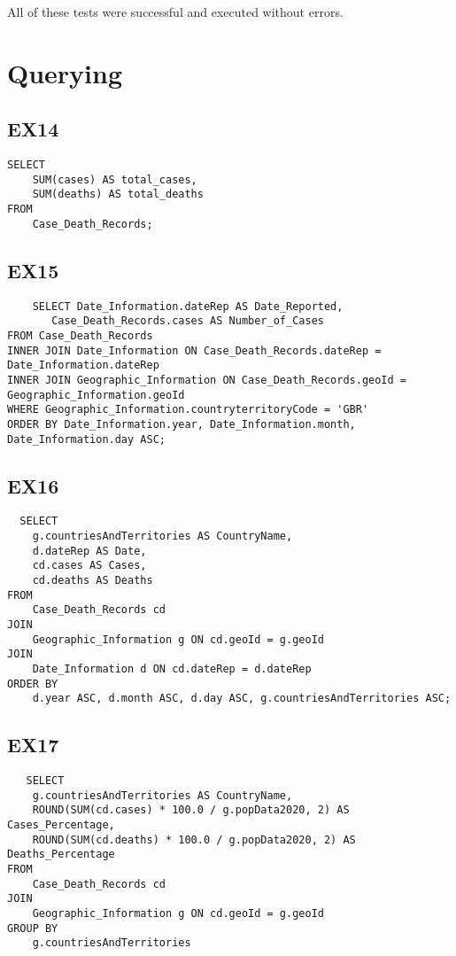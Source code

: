 \documentclass{article}
\begin{document}
All of these tests were successful and executed without errors.
\section{Querying}
\subsection{EX14}


\begin{verbatim}
SELECT 
    SUM(cases) AS total_cases,
    SUM(deaths) AS total_deaths
FROM 
    Case_Death_Records;
\end{verbatim}
\subsection{EX15}
\begin{verbatim}
    SELECT Date_Information.dateRep AS Date_Reported,
       Case_Death_Records.cases AS Number_of_Cases
FROM Case_Death_Records
INNER JOIN Date_Information ON Case_Death_Records.dateRep = Date_Information.dateRep
INNER JOIN Geographic_Information ON Case_Death_Records.geoId = Geographic_Information.geoId
WHERE Geographic_Information.countryterritoryCode = 'GBR'
ORDER BY Date_Information.year, Date_Information.month, Date_Information.day ASC;
\end{verbatim}
\subsection{EX16}
\begin{verbatim}
  SELECT
    g.countriesAndTerritories AS CountryName, 
    d.dateRep AS Date,
    cd.cases AS Cases,
    cd.deaths AS Deaths
FROM
    Case_Death_Records cd
JOIN
    Geographic_Information g ON cd.geoId = g.geoId
JOIN
    Date_Information d ON cd.dateRep = d.dateRep
ORDER BY
    d.year ASC, d.month ASC, d.day ASC, g.countriesAndTerritories ASC;
\end{verbatim}
\subsection{EX17}
\begin{verbatim}
   SELECT
    g.countriesAndTerritories AS CountryName,
    ROUND(SUM(cd.cases) * 100.0 / g.popData2020, 2) AS Cases_Percentage,
    ROUND(SUM(cd.deaths) * 100.0 / g.popData2020, 2) AS Deaths_Percentage
FROM
    Case_Death_Records cd
JOIN
    Geographic_Information g ON cd.geoId = g.geoId
GROUP BY
    g.countriesAndTerritories
\end{verbatim}
\end{document}
